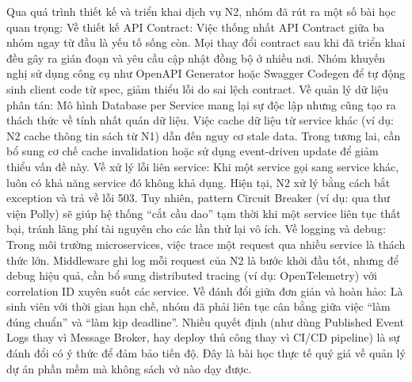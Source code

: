 Qua quá trình thiết kế và triển khai dịch vụ N2, nhóm đã rút ra một số bài học quan trọng: Về thiết kế API Contract: Việc thống nhất API Contract giữa ba nhóm ngay từ đầu là yếu tố sống còn. Mọi thay đổi contract sau khi đã triển khai đều gây ra gián đoạn và yêu cầu cập nhật đồng bộ ở nhiều nơi. Nhóm khuyến nghị sử dụng công cụ như OpenAPI Generator hoặc Swagger Codegen để tự động sinh client code từ spec, giảm thiểu lỗi do sai lệch contract. Về quản lý dữ liệu phân tán: Mô hình Database per Service mang lại sự độc lập nhưng cũng tạo ra thách thức về tính nhất quán dữ liệu. Việc cache dữ liệu từ service khác (ví dụ: N2 cache thông tin sách từ N1) dẫn đến nguy cơ stale data. Trong tương lai, cần bổ sung cơ chế cache invalidation hoặc sử dụng event-driven update để giảm thiểu vấn đề này. Về xử lý lỗi liên service: Khi một service gọi sang service khác, luôn có khả năng service đó không khả dụng. Hiện tại, N2 xử lý bằng cách bắt exception và trả về lỗi 503. Tuy nhiên, pattern Circuit Breaker (ví dụ: qua thư viện Polly) sẽ giúp hệ thống “cắt cầu dao” tạm thời khi một service liên tục thất bại, tránh lãng phí tài nguyên cho các lần thử lại vô ích. Về logging và debug: Trong môi trường microservices, việc trace một request qua nhiều service là thách thức lớn. Middleware ghi log mỗi request của N2 là bước khởi đầu tốt, nhưng để debug hiệu quả, cần bổ sung distributed tracing (ví dụ: OpenTelemetry) với correlation ID xuyên suốt các service. Về đánh đổi giữa đơn giản và hoàn hảo: Là sinh viên với thời gian hạn chế, nhóm đã phải liên tục cân bằng giữa việc “làm đúng chuẩn” và “làm kịp deadline”. Nhiều quyết định (như dùng Published Event Logs thay vì Message Broker, hay deploy thủ công thay vì CI/CD pipeline) là sự đánh đổi có ý thức để đảm bảo tiến độ. Đây là bài học thực tế quý giá về quản lý dự án phần mềm mà không sách vở nào dạy được.
